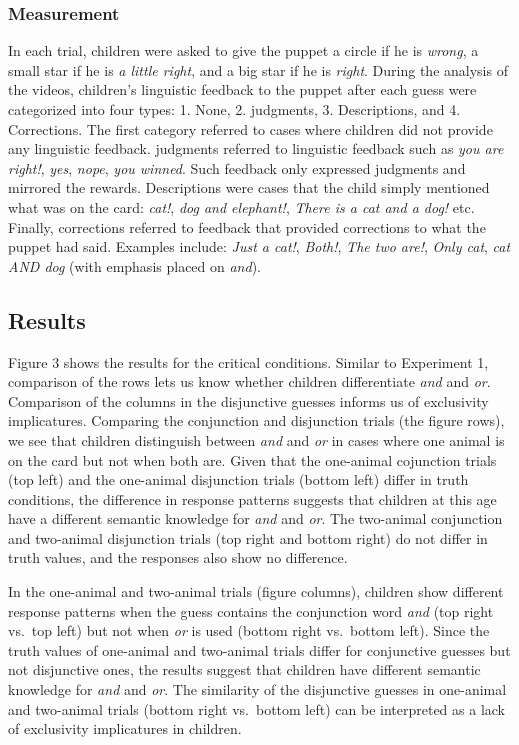 \documentclass[10pt, letterpaper]{article}
\begin{document}
\subsubsection{Measurement}\label{measurement}

In each trial, children were asked to give the puppet a circle if he is
\emph{wrong}, a small star if he is \emph{a little right}, and a big
star if he is \emph{right}. During the analysis of the videos,
children's linguistic feedback to the puppet after each guess were
categorized into four types: 1. None, 2. judgments, 3. Descriptions, and
4. Corrections. The first category referred to cases where children did
not provide any linguistic feedback. judgments referred to linguistic
feedback such as \emph{you are right!}, \emph{yes}, \emph{nope},
\emph{you winned}. Such feedback only expressed judgments and mirrored
the rewards. Descriptions were cases that the child simply mentioned
what was on the card: \emph{cat!}, \emph{dog and elephant!}, \emph{There
is a cat and a dog!} etc. Finally, corrections referred to feedback that
provided corrections to what the puppet had said. Examples include:
\emph{Just a cat!}, \emph{Both!}, \emph{The two are!}, \emph{Only cat},
\emph{cat AND dog} (with emphasis placed on \emph{and}).

\subsection{Results}\label{results-1}

Figure 3 shows the results for the critical conditions. Similar to
Experiment 1, comparison of the rows lets us know whether children
differentiate \emph{and} and \emph{or}. Comparison of the columns in the
disjunctive guesses informs us of exclusivity implicatures. Comparing
the conjunction and disjunction trials (the figure rows), we see that
children distinguish between \emph{and} and \emph{or} in cases where one
animal is on the card but not when both are. Given that the one-animal
cojunction trials (top left) and the one-animal disjunction trials
(bottom left) differ in truth conditions, the difference in response
patterns suggests that children at this age have a different semantic
knowledge for \emph{and} and \emph{or}. The two-animal conjunction and
two-animal disjunction trials (top right and bottom right) do not differ
in truth values, and the responses also show no difference.

In the one-animal and two-animal trials (figure columns), children show
different response patterns when the guess contains the conjunction word
\emph{and} (top right vs.~top left) but not when \emph{or} is used
(bottom right vs.~bottom left). Since the truth values of one-animal and
two-animal trials differ for conjunctive guesses but not disjunctive
ones, the results suggest that children have different semantic
knowledge for \emph{and} and \emph{or}. The similarity of the
disjunctive guesses in one-animal and two-animal trials (bottom right
vs.~bottom left) can be interpreted as a lack of exclusivity
implicatures in children.
\end{document}
